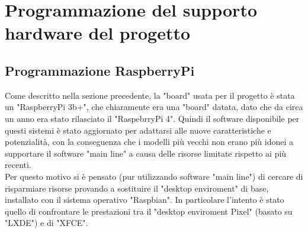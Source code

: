\chapter{Programmazione del supporto hardware del progetto}\label{cap:Programmazione del supporto hardware del progetto}

\section{Programmazione RaspberryPi}\label{sez:Programmazione RaspberryPi}
\raggedright
Come descritto nella sezione precedente, la "board" usata per il progetto è stata un "RaspberryPi 3b+", che chiaramente  era una "board" datata, dato che da circa un anno era stato rilasciato il "RaspebrryPi 4". Quindi il software disponibile per questi sistemi è stato aggiornato per adattarsi alle nuove caratteristiche e potenzialità, con la conseguenza che i modelli più vecchi non erano più idonei a supportare il software "main line" a causa delle risorse limitate rispetto ai più recenti.\\
Per questo motivo si è pensato (pur utilizzando software "main line") di cercare di risparmiare risorse provando a sostituire il "desktop enviroment" di base, installato con il sistema operativo "Raspbian". In particolare l'intento è stato quello di confrontare le prestazioni tra il "desktop enviroment Pixel" (basato su "LXDE") e di "XFCE".  

